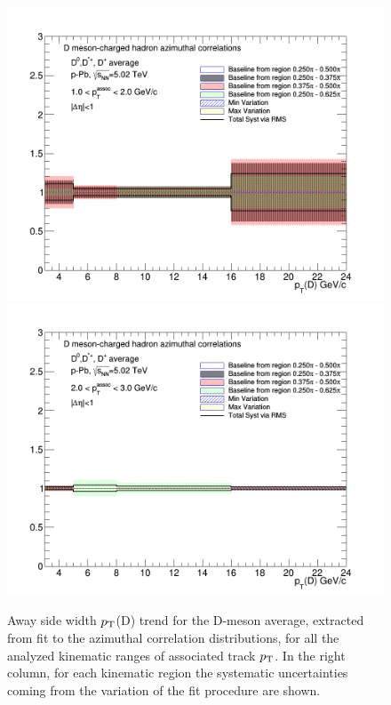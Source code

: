 \begin{figure}[!htbp]
{\includegraphics[width=0.49\linewidth, height=0.33\linewidth]{figures/FitOutput/BaselineSystematicSourcesASSigma_pthad1dotto2dot.png}}
{\includegraphics[width=0.49\linewidth, height=0.33\linewidth]{figures/FitOutput/BaselineSystematicSourcesASSigma_pthad2dotto3dot.png}}

\caption{Away side width $p_{\rm T}$(D) trend for the D-meson average, extracted from fit to the azimuthal correlation distributions, for all the analyzed kinematic ranges of associated track $p_{\rm T}$. In the right column, for each kinematic region the systematic uncertainties coming from the variation of the fit procedure are shown.}
\label{fig:awaysidesigmaAverage}
\end{figure}

